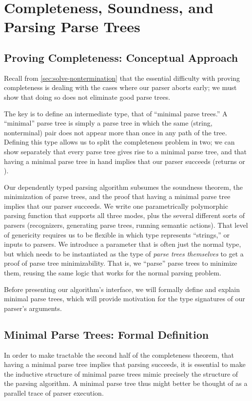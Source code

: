 \chapter{Completeness, Soundness, and Parsing Parse Trees} \label{ch:dep-types}
\section{Proving Completeness: Conceptual Approach} \label{sec:conceptual-completeness} \label{sec:min:conceptual-intro}
  Recall from \autoref{sec:solve-nontermination} that the essential difficulty with proving completeness is dealing with the cases where our parser aborts early; we must show that doing so does not eliminate good parse trees.

  The key is to define an intermediate type, that of ``minimal parse trees.''  A ``minimal'' parse tree is simply a parse tree in which the same (string, nonterminal) pair does not appear more than once in any path of the tree.  Defining this type allows us to split the completeness problem in two; we can show separately that every parse tree gives rise to a minimal parse tree, and that having a minimal parse tree in hand implies that our parser succeeds (returns \true\space or \Some{\termhole}).

  Our dependently typed parsing algorithm subsumes the soundness theorem, the minimization of parse trees, and the proof that having a minimal parse tree implies that our parser succeeds.  We write one parametrically polymorphic parsing function that supports all three modes, plus the several different sorts of parsers (recognizers, generating parse trees, running semantic actions).  That level of genericity requires us to be flexible in which type represents ``strings,'' or inputs to parsers.  We introduce a parameter that is often just the normal \String{} type, but which needs to be instantiated as the type of \emph{parse trees themselves} to get a proof of parse tree minimizability.  That is, we ``parse'' parse trees to minimize them, reusing the same logic that works for the normal parsing problem.

  Before presenting our algorithm's interface, we will formally define and explain minimal parse trees, which will provide motivation for the type signatures of our parser's arguments.

\section{Minimal Parse Trees: Formal Definition} \label{sec:min:formal-definition}
  In order to make tractable the second half of the completeness theorem, that having a minimal parse tree implies that parsing succeeds, it is essential to make the inductive structure of minimal parse trees mimic precisely the structure of the parsing algorithm.  A minimal parse tree thus might better be thought of as a parallel trace of parser execution.

